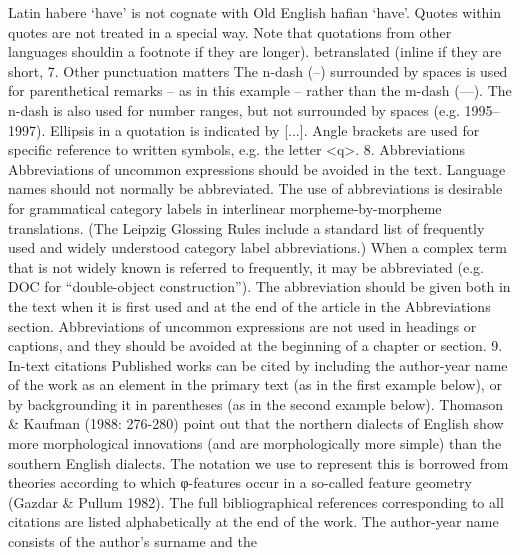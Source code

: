 Latin habere ‘have’ is not cognate with Old English hafian ‘have’.
Quotes within quotes are not treated in a special way.
Note that quotations from other languages shouldin a footnote if they are longer).
betranslated (inline if they are short,
7. Other punctuation matters
The n-dash (–) surrounded by spaces is used for parenthetical remarks – as in this example
– rather than the m-dash (—). The n-dash is also used for number ranges, but not
surrounded by spaces (e.g. 1995–1997).
Ellipsis in a quotation is indicated by [...].
Angle brackets are used for specific reference to written symbols, e.g. the letter <q>.
8. Abbreviations
Abbreviations of uncommon expressions should be avoided in the text. Language names
should not normally be abbreviated.
The use of abbreviations is desirable for grammatical category labels in interlinear
morpheme-by-morpheme translations. (The Leipzig Glossing Rules include a standard list
of frequently used and widely understood category label abbreviations.)
When a complex term that is not widely known is referred to frequently, it may be
abbreviated (e.g. DOC for “double-object construction”). The abbreviation should be given
both in the text when it is first used and at the end of the article in the Abbreviations
section.
Abbreviations of uncommon expressions are not used in headings or captions, and they
should be avoided at the beginning of a chapter or section.
9. In-text citations
Published works can be cited by including the author-year name of the work as an element
in the primary text (as in the first example below), or by backgrounding it in parentheses
(as in the second example below).
Thomason \& Kaufman (1988: 276-280) point out that the northern dialects of English show
more morphological innovations (and are morphologically more simple) than the southern
English dialects.
The notation we use to represent this is borrowed from theories according to which φ-features
occur in a so-called feature geometry (Gazdar \& Pullum 1982).
The full bibliographical references corresponding to all citations are listed alphabetically at
the end of the work. The author-year name consists of the author’s surname and the
	
 	
 	
 	
 	
 	
 	
 	
 	
 	
 	
 	
 	
 	
 	
 	
 	
 	
 	
